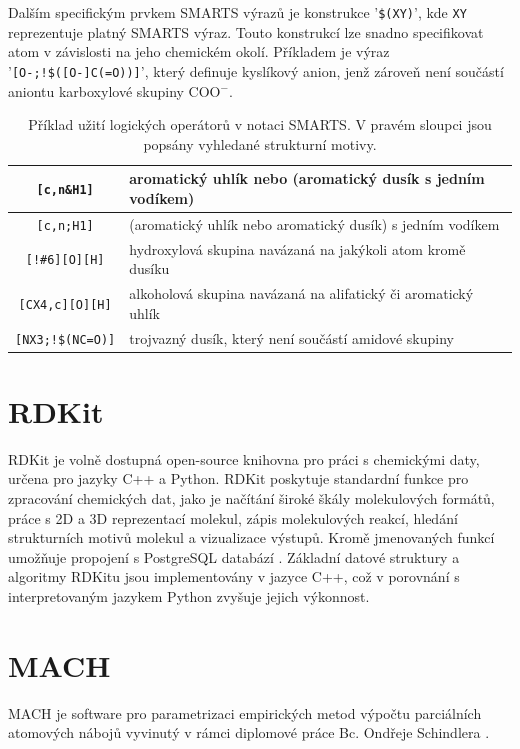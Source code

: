 Dalším specifickým prvkem SMARTS výrazů je konstrukce  '\verb|$(XY)|', kde \verb|XY| reprezentuje platný SMARTS výraz. Touto konstrukcí lze snadno specifikovat atom v závislosti na jeho chemickém okolí. Příkladem je výraz '\verb|[O-;!$([O-]C(=O))]|', který definuje kyslíkový anion, jenž zároveň není součástí aniontu karboxylové skupiny COO$^-$. 
\begin{table}[h]
\label{logops}
\renewcommand{\arraystretch}{1.3}
    \begin{small}
    \hspace{7mm}\begin{tabular}{c|l}
        \verb|[c,n&H1]| & aromatický uhlík nebo (aromatický dusík s jedním vodíkem) \\
        \hline
        \verb|[c,n;H1]| & (aromatický uhlík nebo aromatický dusík) s jedním vodíkem \\
        \hline
        \verb|[!#6][O][H]| & hydroxylová skupina navázaná na jakýkoli atom kromě dusíku \\
        \hline
        \verb|[CX4,c][O][H]| & alkoholová skupina navázaná na alifatický či aromatický uhlík \\
        \hline
        \verb|[NX3;!$(NC=O)]| & trojvazný dusík, který není součástí amidové skupiny\\
    \end{tabular}
    \end{small}
    \caption{Příklad užití logických operátorů v notaci SMARTS. V pravém sloupci jsou popsány vyhledané strukturní motivy.}
\end{table}
\section{RDKit}
RDKit \cite{rdk_info} je volně dostupná open-source knihovna pro práci s chemickými daty, určena pro jazyky C++ a Python. RDKit poskytuje standardní funkce pro zpracování chemických dat, jako je načítání široké škály molekulových formátů, práce s 2D a 3D reprezentací molekul, zápis molekulových reakcí, hledání strukturních motivů molekul a vizualizace výstupů. Kromě jmenovaných funkcí umožňuje propojení s PostgreSQL databází \cite{Postgre}. Základní datové struktury a algoritmy RDKitu jsou implementovány v jazyce C++, což v porovnání s interpretovaným jazykem Python zvyšuje jejich výkonnost.

\section{MACH}
MACH je software pro parametrizaci empirických metod výpočtu parciálních atomových nábojů
vyvinutý v rámci diplomové práce Bc. Ondřeje Schindlera \cite{mach}. 

